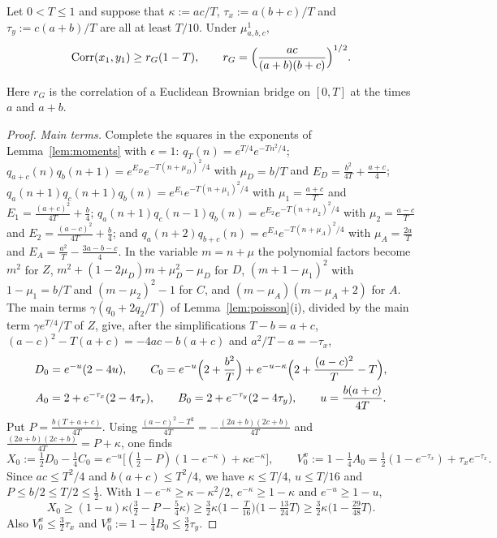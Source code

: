 \begin{lemma}\label{lem:bridge1}
Let $0<T\le1$ and suppose that $\kappa:=ac/T$, $\tau_x:=a(b+c)/T$ and $\tau_y:=
c(a+b)/T$ are all at least $T/10$. Under $\mu^1_{a,b,c}$,
\[
\operatorname{Corr}(x_1,y_1)\ge r_G(1-T),\qquad r_G=\Bigl(\frac{ac}{(a+b)(b+c)}
\Bigr)^{1/2}.
\]
\end{lemma}

Here $r_G$ is the correlation of a Euclidean Brownian bridge on $[0,T]$ at the
times $a$ and $a+b$.

\begin{proof}
\emph{Main terms.} Complete the squares in the exponents of
Lemma~\ref{lem:moments} with $\epsilon=1$: $q_T(n)=e^{T/4}e^{-Tn^2/4}$;
$q_{a+c}(n)q_b(n+1)=e^{E_D}e^{-T(n+\mu_D)^2/4}$ with $\mu_D=b/T$ and $E_D=
\frac{b^2}{4T}+\frac{a+c}4$; $q_a(n+1)q_c(n+1)q_b(n)=e^{E_1}e^{-T(n+\mu_1)^2/4}$
with $\mu_1=\frac{a+c}T$ and $E_1=\frac{(a+c)^2}{4T}+\frac b4$; $q_a(n+1)q_c(n-1)
q_b(n)=e^{E_2}e^{-T(n+\mu_2)^2/4}$ with $\mu_2=\frac{a-c}T$ and $E_2=\frac{(a-c)^2}
{4T}+\frac b4$; and $q_a(n+2)q_{b+c}(n)=e^{E_A}e^{-T(n+\mu_A)^2/4}$ with $\mu_A=
\frac{2a}T$ and $E_A=\frac{a^2}T-\frac{3a-b-c}4$. In the variable $m=n+\mu$ the
polynomial factors become $m^2$ for $Z$, $m^2+(1-2\mu_D)m+\mu_D^2-\mu_D$ for
$D$, $(m+1-\mu_1)^2$ with $1-\mu_1=b/T$ and $(m-\mu_2)^2-1$ for $C$, and
$(m-\mu_A)(m-\mu_A+2)$ for $A$. The main terms $\gamma(q_0+2q_2/T)$ of
Lemma~\ref{lem:poisson}(i), divided by the main term $\gamma e^{T/4}/T$ of $Z$,
give, after the simplifications $T-b=a+c$, $(a-c)^2-T(a+c)=-4ac-b(a+c)$ and
$a^2/T-a=-\tau_x$,
\begin{gather*}
D_0=e^{-u}(2-4u),\qquad C_0=e^{-u}\Bigl(2+\frac{b^2}T\Bigr)+e^{-u-\kappa}
\Bigl(2+\frac{(a-c)^2}T-T\Bigr),\\
A_0=2+e^{-\tau_x}(2-4\tau_x),\qquad B_0=2+e^{-\tau_y}(2-4\tau_y),\qquad
u=\frac{b(a+c)}{4T}.
\end{gather*}
Put $P=\frac{b(T+a+c)}{4T}$. Using $\frac{(a-c)^2-T^2}{4T}=-\frac{(2a+b)(2c+b)}
{4T}$ and $\frac{(2a+b)(2c+b)}{4T}=P+\kappa$, one finds
\[
X_0:=\tfrac12D_0-\tfrac14C_0=e^{-u}\bigl[(\tfrac12-P)(1-e^{-\kappa})+\kappa
e^{-\kappa}\bigr],\qquad V^x_0:=1-\tfrac14A_0=\tfrac12(1-e^{-\tau_x})+\tau_x
e^{-\tau_x}.
\]
Since $ac\le T^2/4$ and $b(a+c)\le T^2/4$, we have $\kappa\le T/4$, $u\le T/16$
and $P\le b/2\le T/2\le\frac12$. With $1-e^{-\kappa}\ge\kappa-\kappa^2/2$,
$e^{-\kappa}\ge1-\kappa$ and $e^{-u}\ge1-u$,
\[
X_0\ge(1-u)\kappa\bigl(\tfrac32-P-\tfrac54\kappa\bigr)\ge\tfrac32\kappa\bigl(1-
\tfrac T{16}\bigr)\bigl(1-\tfrac{13}{24}T\bigr)\ge\tfrac32\kappa\bigl(1-\tfrac{29}
{48}T\bigr).
\]
Also $V^x_0\le\frac32\tau_x$ and $V^y_0:=1-\frac14B_0\le\frac32\tau_y$.


\end{proof}
